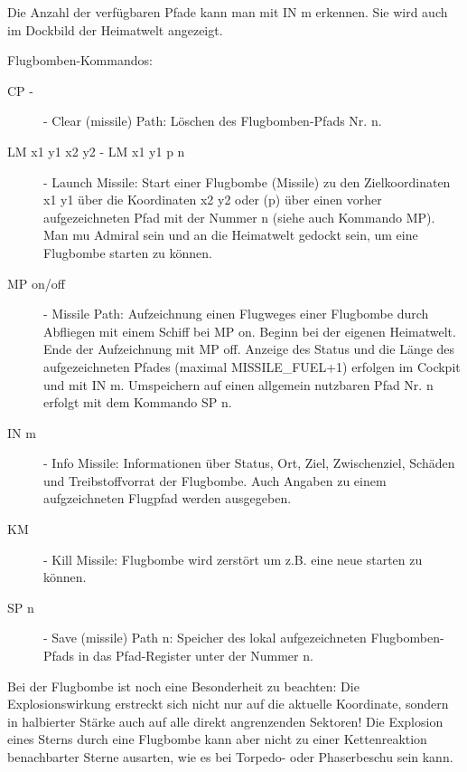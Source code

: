 Die Anzahl der verf\"ugbaren Pfade kann man mit IN m erkennen. Sie wird auch im
Dockbild der Heimatwelt angezeigt.

Flugbomben-Kommandos:
\begin{description}

\item [CP -] - Clear (missile) Path: L\"oschen des Flugbomben-Pfads Nr. n.

\item [LM x1 y1 x2 y2 -  LM x1 y1 p n] - Launch Missile: Start einer Flugbombe 
                (Missile) zu den Zielkoordinaten
                x1 y1 \"uber die Koordinaten x2 y2 oder (p) \"uber einen vorher
                aufgezeichneten Pfad mit der Nummer n 
                (siehe auch Kommando MP).  
                Man mu\3 Admiral sein und an die Heimatwelt gedockt sein, 
                um eine Flugbombe starten zu k\"onnen.

\item [MP on/off] - Missile Path: Aufzeichnung einen Flugweges einer 
            Flugbombe durch Abfliegen mit einem Schiff bei MP on. Beginn
            bei der eigenen Heimatwelt. Ende der Aufzeichnung mit MP off.
            Anzeige des Status und die
            L\"ange des aufgezeichneten Pfades (maximal MISSILE\_FUEL+1)
            erfolgen im Cockpit und mit IN m. Umspeichern auf einen allgemein
            nutzbaren Pfad Nr. n erfolgt mit dem Kommando SP n.

\item [IN m] - Info Missile: Informationen \"uber Status, Ort, Ziel,
               Zwischenziel, Sch\"aden und Treibstoffvorrat der Flugbombe.
               Auch Angaben zu einem aufgzeichneten Flugpfad werden ausgegeben.

\item [KM] - Kill Missile: Flugbombe wird zerst\"ort um z.B. eine neue
             starten zu k\"onnen.
\item [SP n] - Save (missile) Path n: Speicher des lokal aufgezeichneten
               Flugbomben-Pfads in das Pfad-Register unter der Nummer n.
\end{description}


Bei der Flugbombe ist noch eine Besonderheit zu beachten: Die Explosionswirkung
erstreckt sich nicht nur auf die aktuelle Koordinate, sondern in halbierter
St\"arke auch auf alle direkt angrenzenden Sektoren! Die Explosion eines Sterns
durch eine Flugbombe kann aber nicht zu einer Kettenreaktion benachbarter
Sterne ausarten, wie es bei Torpedo- oder Phaserbeschu\3 sein kann.


